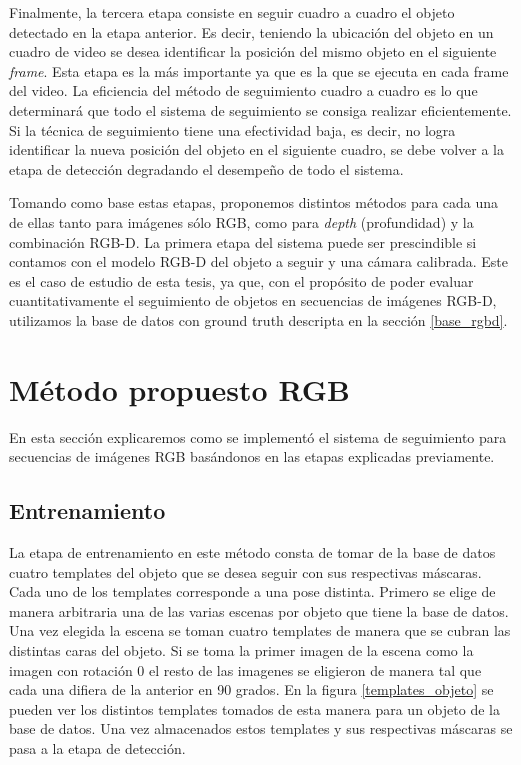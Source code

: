 Finalmente, la tercera etapa consiste en seguir cuadro a cuadro el objeto detectado en la etapa anterior. Es decir, teniendo la ubicación del objeto en un cuadro de video se desea identificar la posición del mismo objeto en el siguiente \textit{frame}. Esta etapa es la más importante ya que es la que se ejecuta en cada frame del video. La eficiencia del método de seguimiento cuadro a cuadro es lo que determinará que todo el sistema de seguimiento se consiga realizar eficientemente. Si la técnica de seguimiento tiene una efectividad baja, es decir, no logra identificar la nueva posición del objeto en el siguiente cuadro, se debe volver a la etapa de detección degradando el desempeño de todo el sistema.

Tomando como base estas etapas, proponemos distintos métodos para cada una de ellas tanto para imágenes sólo RGB, como para \textit{depth} (profundidad) y la combinación RGB-D. La primera etapa del sistema puede ser prescindible si contamos con el modelo RGB-D del objeto a seguir y una cámara calibrada. Este es el caso de estudio de esta tesis, ya que, con el propósito de poder evaluar cuantitativamente el seguimiento de objetos en secuencias de imágenes RGB-D, utilizamos la base de datos con ground truth descripta en la sección \ref{base_rgbd}.

\section{Método propuesto RGB}\label{metodo_rgb}
En esta sección explicaremos como se implementó el sistema de seguimiento para secuencias de imágenes RGB basándonos en las etapas explicadas previamente.

\subsection{Entrenamiento}
La etapa de entrenamiento en este método consta de tomar de la base de datos cuatro templates del objeto que se desea seguir con sus respectivas máscaras. Cada uno de los templates corresponde a una pose distinta. Primero se elige de manera arbitraria una de las varias escenas por objeto que tiene la base de datos. Una vez elegida la escena se toman cuatro templates de manera que se cubran las distintas caras del objeto. Si se toma la primer imagen de la escena como la imagen con rotación 0 el resto de las imagenes se eligieron de manera tal que cada una difiera de la anterior en 90 grados. En la figura \ref{templates_objeto} se pueden ver los distintos templates tomados de esta manera para un objeto de la base de datos. Una vez almacenados estos templates y sus respectivas máscaras se pasa a la etapa de detección.

